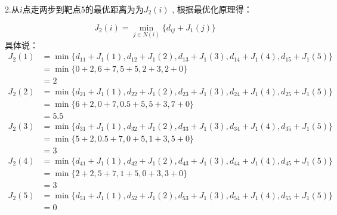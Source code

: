 \begin{example}
    2.从$i$点走两步到靶点5的最优距离为为$J_2(i)$ , 根据最优化原理得：

    \begin{equation}
        J_2(i)=\min_{j\in N(i)}\{d_{ij}+J_1(j)\}
    \end{equation}
    具体说：
    \begin{equation}
        \begin{aligned}
            J_2(1) & = \min\{d_{11}+J_1(1),d_{12}+J_1(2),d_{13}+J_1(3),d_{14}+J_1(4),d_{15}+J_1(5)\} \\
                   & = \min\{0+2,6+7,5+5,2+3,2+0\}                                                   \\
                   & = 2                                                                             \\
            J_2(2) & = \min\{d_{21}+J_1(1),d_{22}+J_1(2),d_{23}+J_1(3),d_{24}+J_1(4),d_{25}+J_1(5)\} \\
                   & = \min\{6+2,0+7,0.5+5,5+3,7+0\}                                                 \\
                   & = 5.5                                                                           \\
            J_2(3) & = \min\{d_{31}+J_1(1),d_{32}+J_1(2),d_{33}+J_1(3),d_{34}+J_1(4),d_{35}+J_1(5)\} \\
                   & = \min\{5+2,0.5+7,0+5,1+3,5+0\}                                                 \\
                   & = 3                                                                             \\
            J_2(4) & = \min\{d_{41}+J_1(1),d_{42}+J_1(2),d_{43}+J_1(3),d_{44}+J_1(4),d_{45}+J_1(5)\} \\
                   & = \min\{2+2,5+7,1+5,0+3,3+0\}                                                   \\
                   & = 3                                                                             \\
            J_2(5) & = \min\{d_{51}+J_1(1),d_{52}+J_1(2),d_{53}+J_1(3),d_{54}+J_1(4),d
            _{55}+J_1(5)\}                                                                           \\
                   & = 0                                                                             \\
        \end{aligned}
    \end{equation}


\end{example}
